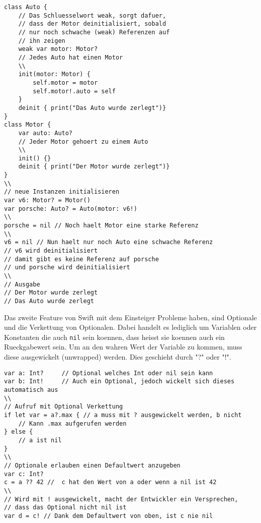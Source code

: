 \begin{lstlisting}
class Auto {
    // Das Schluesselwort weak, sorgt dafuer,
    // dass der Motor deinitialisiert, sobald
    // nur noch schwache (weak) Referenzen auf
    // ihn zeigen
    weak var motor: Motor? 
    // Jedes Auto hat einen Motor
    \\
    init(motor: Motor) {
        self.motor = motor
        self.motor!.auto = self
    }
    deinit { print("Das Auto wurde zerlegt")}
}
class Motor {
    var auto: Auto? 
    // Jeder Motor gehoert zu einem Auto
    \\
    init() {}
    deinit { print("Der Motor wurde zerlegt")}
}
\\
// neue Instanzen initialisieren
var v6: Motor? = Motor()
var porsche: Auto? = Auto(motor: v6!)
\\
porsche = nil // Noch haelt Motor eine starke Referenz
\\
v6 = nil // Nun haelt nur noch Auto eine schwache Referenz
// v6 wird deinitialisiert
// damit gibt es keine Referenz auf porsche
// und porsche wird deinitialisiert
\\
// Ausgabe
// Der Motor wurde zerlegt
// Das Auto wurde zerlegt
\end{lstlisting}
Das zweite Feature von Swift mit dem Einsteiger Probleme haben, sind Optionale und die Verkettung von Optionalen. Dabei handelt es lediglich um Variablen oder Konstanten die auch \lstinline{nil} sein koennen, dass heisst sie koennen auch ein Rueckgabewert sein. Um an den wahren Wert der Variable zu kommen, muss diese ausgewickelt (unwrapped) werden. Dies geschieht durch "?" oder "!". 
\begin{lstlisting}
var a: Int? 	// Optional welches Int oder nil sein kann
var b: Int! 	// Auch ein Optional, jedoch wickelt sich dieses automatisch aus
\\
// Aufruf mit Optional Verkettung
if let var = a?.max { // a muss mit ? ausgewickelt werden, b nicht
	// Kann .max aufgerufen werden
} else {
	// a ist nil
}
\\
// Optionale erlauben einen Defaultwert anzugeben
var c: Int?
c = a ?? 42 //  c hat den Wert von a oder wenn a nil ist 42
\\
// Wird mit ! ausgewickelt, macht der Entwickler ein Versprechen,
// dass das Optional nicht nil ist
var d = c! // Dank dem Defaultwert von oben, ist c nie nil
\end{lstlisting}
